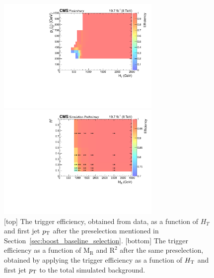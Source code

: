 \begin{figure}[htpb]
\centering
\includegraphics[width=0.7\textwidth]{figures/razor_trigger/h_HT_j1pt_pre_eff_ph_l}

\includegraphics[width=0.7\textwidth]{figures/razor_trigger/MR_R2_bg_trig_eff}
\caption{[top] The trigger efficiency, obtained from data, as a function of $H_T$ and first jet
$p_{\mathrm{T}}$ after the preselection mentioned in Section~\ref{sec:boost_baseline_selection}.
[bottom] The trigger efficiency as a function of $\mathrm{M_R}$ and $\mathrm{R^2}$ after the same
preselection, obtained by applying the trigger efficiency as a function of $H_{\mathrm{T}} $ and first jet $p_{\mathrm{T}}$
to the total simulated background. 
\label{fig:boost_trigger_efficiency}}
\end{figure}  


